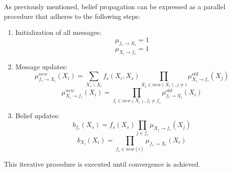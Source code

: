 As previously mentioned, belief propagation can be expressed as a parallel procedure that adheres to the following steps:
\begin{enumerate}
    \item Initialization of all messages:
        \[\mu_{f_s\rightarrow X_i}= 1\]
        \[\mu_{X_i \rightarrow f_s}= 1\]
    \item Message updates:
        \[\mu_{f_s\rightarrow X_i}^{new}(X_i)=\sum_{X_s \backslash X_i}f_s(X_i,X_s)\prod_{X_j \in new(X_i), j \neq i}\mu_{X_i \rightarrow f_s}^{old}(X_j)\]
        \[\mu_{X_i \rightarrow f_s}^{new}(X_i)=\prod_{f_l \in new(X_i),f_l \neq f_s}\mu_{f_l \rightarrow X_i}^{old}(X_i)\]
    \item Belief updates:
        \[b_{f_s}(X_s)=f_s(X_s) \prod_{j \in f_s}\mu_{X_j \rightarrow f_s}(X_j)\]
        \[b_{X_i}(X_i)=\prod_{f_s \in new(i)}\mu_{f_s \rightarrow X_i}(X_i)\]
\end{enumerate}
This iterative procedure is executed until convergence is achieved.
